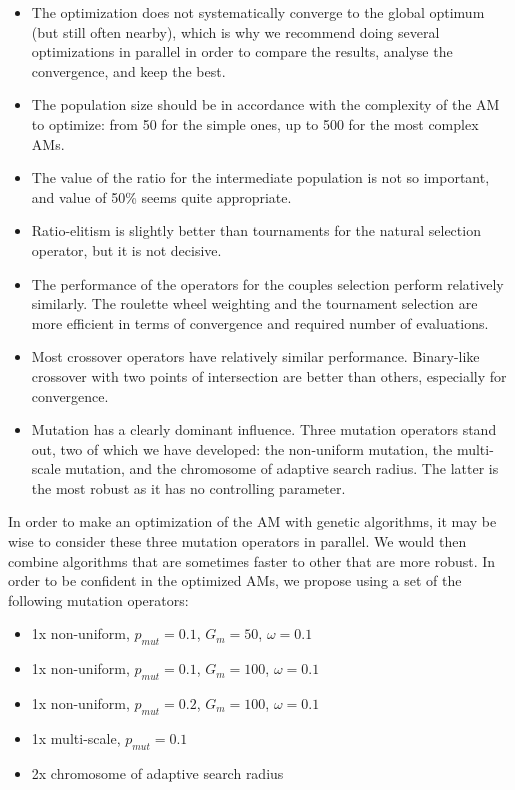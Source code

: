 \documentclass[twocol]{ametsoc}
\begin{document}
\begin{itemize}
	\item The optimization does not systematically converge to the global optimum  (but still often nearby), which is why we recommend doing several optimizations in parallel in order to compare the results, analyse the convergence, and keep the best.
	
	\item The population size should be in accordance with the complexity of the AM to optimize: from 50 for the simple ones, up to 500 for the most complex AMs.
	
	\item The value of the ratio for the intermediate population is not so important, and value of 50\% seems quite appropriate.
	
	\item Ratio-elitism is slightly better than tournaments for the natural selection operator, but it is not decisive.
	
	\item The performance of the operators for the couples selection perform relatively similarly. The roulette wheel weighting and the tournament selection are more efficient in terms of convergence and required number of evaluations.
	
	\item Most crossover operators have relatively similar performance. Binary-like crossover with two points of intersection are better than others, especially for convergence.
	
	\item Mutation has a clearly dominant influence. Three mutation operators stand out, two of which we have developed: the non-uniform mutation, the multi-scale mutation, and the chromosome of adaptive search radius. The latter is the most robust as it has no controlling parameter.
	
\end{itemize}

In order to make an optimization of the AM with genetic algorithms, it may be wise to consider these three mutation operators in parallel. We would then combine algorithms that are sometimes faster to other that are more robust. In order to be confident in the optimized AMs, we propose using a set of the following mutation operators:

\begin{itemize}
	\setlength\itemsep{-4px}
	\item 1x non-uniform, $p_{mut}=0.1$, $G_{m}=50$, $\omega=0.1$
	\item 1x non-uniform, $p_{mut}=0.1$, $G_{m}=100$, $\omega=0.1$
	\item 1x non-uniform, $p_{mut}=0.2$, $G_{m}=100$, $\omega=0.1$
	\item 1x multi-scale,  $p_{mut}=0.1$
	\item 2x chromosome of adaptive search radius
\end{itemize}
\end{document}
